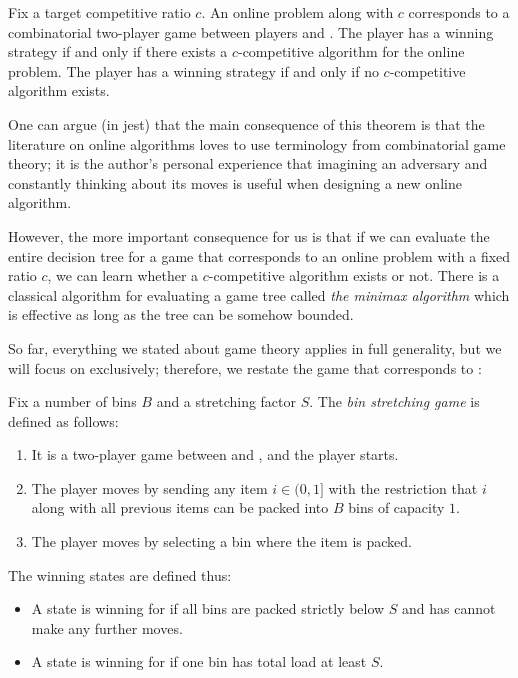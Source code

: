 
\begin{thm}
Fix a target competitive ratio $c$. An online problem along
with $c$ corresponds to a combinatorial two-player game between
players \algo and \adversary. The player \algo has a winning
strategy if and only if there exists a $c$-competitive algorithm for
the online problem. The player \adversary has a winning strategy
if and only if no $c$-competitive algorithm exists.
\end{thm}

One can argue (in jest) that the main consequence of this theorem is
that the literature on online algorithms loves to use terminology from
combinatorial game theory; it is the author's personal experience that
imagining an adversary and constantly thinking about its moves is
useful when designing a new online algorithm.

However, the more important consequence for us is that if we can
evaluate the entire decision tree for a game that corresponds to an
online problem with a fixed ratio $c$, we can learn whether a
$c$-competitive algorithm exists or not. There is a classical
algorithm for evaluating a game tree called \emph{the minimax
algorithm} which is effective as long as the tree can be somehow
bounded.

So far, everything we stated about game theory applies in full
generality, but we will focus on \binstretch exclusively; therefore,
we restate the game that corresponds to \binstretch:

\begin{dfn}
Fix a number of bins $B$ and a stretching factor $S$. The \emph{bin stretching game}
is defined as follows:

\begin{enumerate}
\item It is a two-player game between \algo and \adversary, and the player \adversary starts.
\item The player \adversary moves by sending any item $i \in (0,1]$ with the restriction
that $i$ along with all previous items can be packed into $B$ bins of capacity $1$.
\item The player \algo moves by selecting a bin where the item is packed.
\end{enumerate}

The winning states are defined thus:
\begin{itemize}
\item A state is winning for \algo if all bins are packed strictly below $S$ and \adversary
has cannot make any further moves.
\item A state is winning for \adversary if one bin has total load at least $S$.
\end{itemize}
\end{dfn}


